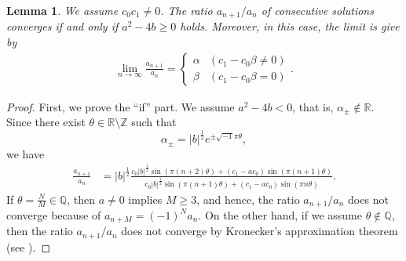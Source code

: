 \documentclass[a4paper,11pt,reqno]{amsart}
\theoremstyle{plain}
\newtheorem{lem}[thm]{Lemma}
\theoremstyle{definition}
\begin{document}
\begin{lem}
\label{lem:limit exa}
We assume $c_{0}c_{1}\not=0$. 
The ratio $a_{n+1}/a_{n}$ of consecutive solutions converges if and only if 
$a^{2}-4b\geq 0$ holds. 
Moreover, in this case, the limit is give by 
\begin{align}
\label{eq:limit exa}
\lim_{n \to \infty}
   \frac{a_{n+1}}{a_{n}}
   =
   \begin{cases}
   \alpha & (c_{1}-c_{0}\beta \not=0) \\
   \beta & (c_{1}-c_{0}\beta =0)
   \end{cases}.
\end{align}
\end{lem}
\begin{proof}
First, we prove the ``if'' part. 
We assume $a^{2}-4b<0$, that is, $\alpha _{\pm } \not\in \mathbb{R}$. 
Since there exist $\theta \in \mathbb{R}\setminus \mathbb{Z}$ such that 
$$
\alpha _{\pm }
   =
   |b|^{\frac{1}{2}}e^{\pm \sqrt{-1}\pi \theta } ,
$$
we have 
\begin{align*}
\frac{a_{n+1}}{a_{n}}
   &=
   |b|^{\frac{1}{2}}\frac{c_{0}|b|^{\frac{1}{2}}\sin{(\pi (n+2)\theta )}+(c_{1}-ac_{0})\sin{(\pi (n+1)\theta )}}{c_{0}|b|^{\frac{1}{2}}\sin{(\pi (n+1)\theta )}+(c_{1}-ac_{0})\sin{(\pi n\theta )}}.
\end{align*}
If $\theta =\frac{N}{M}\in \mathbb{Q}$, then $a\not=0$ implies $M\geq 3$, and hence, 
the ratio $a_{n+1}/a_{n}$ does not converge because of $a_{n+M}=(-1)^{N}a_{n}$. 
On the other hand, if we assume $\theta \not\in \mathbb{Q}$, then the ratio $a_{n+1}/a_{n}$ does not converge
by Kronecker's approximation theorem (see \cite[Theorem 439]{HW}). 


\end{proof}
\end{document}
